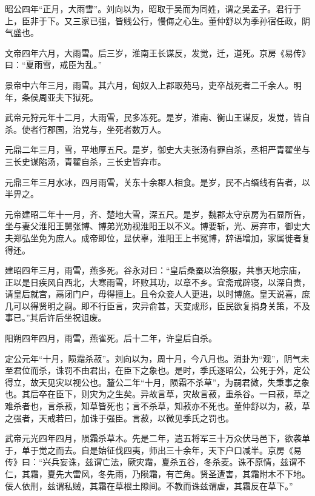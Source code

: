 \documentclass[12pt,UTF8]{ctexbook}
\begin{document}
昭公四年“正月，大雨雪”。刘向以为，昭取于吴而为同姓，谓之吴孟子。君行于上，臣非于下。又三家已强，皆贱公行，慢侮之心生。董仲舒以为季孙宿任政，阴气盛也。



文帝四年六月，大雨雪。后三岁，淮南王长谋反，发觉，迁，道死。京房《易传》曰：“夏雨雪，戒臣为乱。”



景帝中六年三月，雨雪。其六月，匈奴入上郡取苑马，吏卒战死者二千余人。明年，条侯周亚夫下狱死。



武帝元狩元年十二月，大雨雪，民多冻死。是岁，淮南、衡山王谋反，发觉，皆自杀。使者行郡国，治党与，坐死者数万人。



元鼎二年三月，雪，平地厚五尺。是岁，御史大夫张汤有罪自杀，丞相严青翟坐与三长史谋陷汤，青翟自杀，三长史皆弃市。



元鼎三年三月水冰，四月雨雪，关东十余郡人相食。是岁，民不占缗线有告者，以半畀之。



元帝建昭二年十一月，齐、楚地大雪，深五尺。是岁，魏郡太守京房为石显所告，坐与妻父淮阳王舅张博、博弟光劝视淮阳王以不义。博要斩，光、房弃市，御史大夫郑弘坐免为庶人。成帝即位，显伏辜，淮阳王上书冤博，辞语增加，家属徙者复得还。



建昭四年三月，雨雪，燕多死。谷永对曰：“皇后桑蚕以治祭服，共事天地宗庙，正以是日疾风自西北，大寒雨雪，坏败其功，以章不乡。宜斋戒辟寝，以深自责，请皇后就宫，鬲闭门户，毋得擅上。且令众妾人人更进，以时博施。皇天说喜，庶几可以得贤明之嗣。即不行臣言，灾异俞甚，天变成形，臣民欲复捐身关策，不及事已。”其后许后坐祝诅废。



阳朔四年四月，雨雪，燕雀死。后十二年，许皇后自杀。



定公元年“十月，陨霜杀菽”。刘向以为，周十月，今八月也。消卦为“观”，阴气未至君位而杀，诛罚不由君出，在臣下之象也。是时，季氏逐昭公，公死于外，定公得立，故天见灾以视公也。釐公二年“十月，陨霜不杀草”，为嗣君微，失秉事之象也。其后卒在臣下，则灾为之生矣。异故言草，灾故言菽，重杀谷。一曰菽，草之难杀者也，言杀菽，知草皆死也；言不杀草，知菽亦不死也。董仲舒以为，菽，草之强者，天戒若曰，加诛于强臣。言菽，以微见季氏之罚也。



武帝元光四年四月，陨霜杀草木。先是二年，遣五将军三十万众伏马邑下，欲袭单于，单于觉之而去。自是始征伐四夷，师出三十余年，天下户口减半。京房《易传》曰：“兴兵妄诛，兹谓亡法，厥灾霜，夏杀五谷，冬杀麦。诛不原情，兹谓不仁，其霜，夏先大雷风，冬先雨，乃陨霜，有芒角。贤圣遭害，其霜附木不下地。佞人依刑，兹谓私贼，其霜在草根土隙间。不教而诛兹谓虐，其霜反在草下。”
\end{document}
